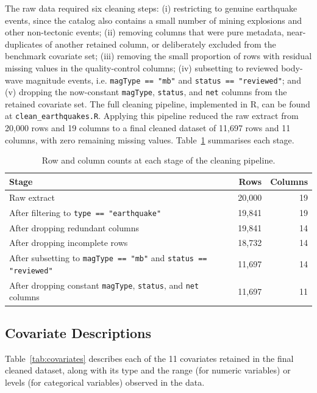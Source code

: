 \documentclass[11pt,twoside,a4paper]{article}
\begin{document}
The raw data required six cleaning steps: (i) restricting to genuine earthquake
events, since the catalog also contains a small number of mining explosions and
other non-tectonic events; (ii) removing columns that were pure metadata,
near-duplicates of another retained column, or deliberately excluded from the
benchmark covariate set; (iii) removing the small proportion of rows with
residual missing values in the quality-control columns; (iv) subsetting to
reviewed body-wave magnitude events, i.e. \texttt{magType == "mb"} and
\texttt{status == "reviewed"}; and (v) dropping the now-constant
\texttt{magType}, \texttt{status}, and \texttt{net} columns from the retained covariate set.
The full cleaning pipeline, implemented in R, can be found at \nolinkurl{clean_earthquakes.R}\cite{repo}. Applying this pipeline reduced the raw extract from 20{,}000 rows and 19 columns
to a final cleaned dataset of 11{,}697 rows and 11 columns, with zero remaining
missing values. Table~\ref{tab:pipeline} summarises each stage.

\begin{table}[h]
\centering
\begin{tabular}{lrr}
\toprule
Stage & Rows & Columns \\
\midrule
Raw extract & 20{,}000 & 19 \\
After filtering to \texttt{type == "earthquake"} & 19{,}841 & 19 \\
After dropping redundant columns & 19{,}841 & 14 \\
After dropping incomplete rows & 18{,}732 & 14 \\
After subsetting to \texttt{magType == "mb"} and \texttt{status == "reviewed"} & 11{,}697 & 14 \\
After dropping constant \texttt{magType}, \texttt{status}, and \texttt{net} columns & 11{,}697 & 11 \\
\bottomrule
\end{tabular}
\caption{Row and column counts at each stage of the cleaning pipeline.}
\label{tab:pipeline}
\end{table}

\subsection{Covariate Descriptions}

Table~\ref{tab:covariates} describes each of the 11 covariates retained in the
final cleaned dataset, along with its type and the range (for numeric variables)
or levels (for categorical variables) observed in the data.
\end{document}

